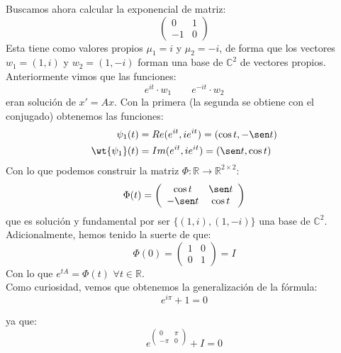 \begin{ejemplo}
    Buscamos ahora calcular la exponencial de matriz:
    \begin{equation*}
        \left(\begin{array}{cc}
                0 & 1 \\
                -1 & 0
        \end{array}\right)
    \end{equation*}
    Esta tiene como valores propios $\mu_1 = i$ y $\mu_2 = -i$, de forma que los vectores $w_1=(1,i)$ y $w_2=(1,-i)$ forman una base de $\mathbb{C}^2$ de vectores propios. Anteriormente vimos que las funciones:
    \begin{equation*}
        e^{it}\cdot w_1 \qquad e^{-it} \cdot w_2
    \end{equation*}
    eran solución de $x'=Ax$. Con la primera (la segunda se obtiene con el conjugado) obtenemos las funciones:
    \begin{align*}
        \psi_1(t) &= Re(e^{it}, ie^{it}) = (\cos t, -\sen t) \\
        \wt{\psi_1}(t) &= Im(e^{it}, ie^{it})  = (\sen t, \cos t)
    \end{align*}
    Con lo que podemos construir la matriz $\Phi:\mathbb{R}\rightarrow\mathbb{R}^{2\times 2}$:
    \begin{equation*}
        \Phi(t) = \left(\begin{array}{cc}
                \cos t & \sen t \\
                -\sen t & \cos t 
        \end{array}\right)
    \end{equation*}
    que es solución y fundamental por ser $\{(1,i),(1,-i)\}$ una base de $\mathbb{C}^2$. Adicionalmente, hemos tenido la suerte de que:
    \begin{equation*}
        \Phi(0) = \left(\begin{array}{cc}
                1 & 0 \\
                0 & 1
        \end{array}\right) = I
    \end{equation*}
    Con lo que $e^{tA} = \Phi(t)$ $\forall t\in \mathbb{R}$.\\

    Como curiosidad, vemos que obtenemos la generalización de la fórmula:
    \begin{equation*}
        e^{i\pi} +1 = 0
    \end{equation*}

    ya que:
    \begin{equation*}
        e^{\begin{pmatrix}
        0 & \pi \\
        -\pi & 0
        \end{pmatrix}} +I=0
    \end{equation*}
\end{ejemplo}

